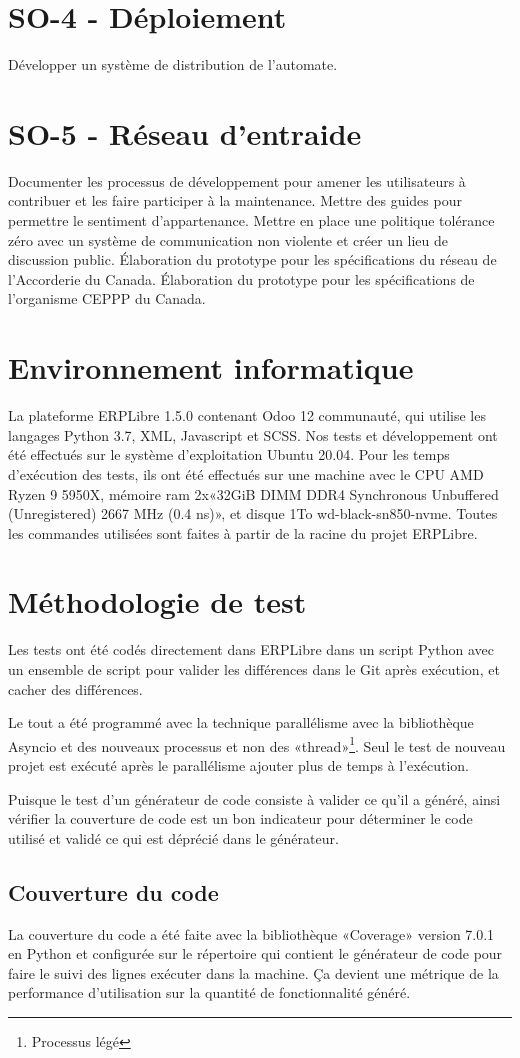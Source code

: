 \section{SO-4 - Déploiement}
Développer un système de distribution de l’automate.

\section{SO-5 - Réseau d’entraide}
Documenter les processus de développement pour amener les utilisateurs à contribuer et les faire participer à la maintenance. Mettre des guides pour permettre le sentiment d'appartenance. Mettre en place une politique tolérance zéro avec un système de communication non violente et créer un lieu de discussion public. Élaboration du prototype pour les spécifications du réseau de l’Accorderie du Canada. Élaboration du prototype pour les spécifications de l’organisme CEPPP du Canada.

\section{Environnement informatique}
La plateforme ERPLibre 1.5.0 contenant Odoo 12 communauté, qui utilise les langages Python 3.7, XML, Javascript et SCSS. Nos tests et développement ont été effectués sur le système d’exploitation Ubuntu 20.04.
Pour les temps d’exécution des tests, ils ont été effectués sur une machine avec le CPU AMD Ryzen 9 5950X, mémoire ram 2x«32GiB DIMM DDR4 Synchronous Unbuffered (Unregistered) 2667 MHz (0.4 ns)», et disque 1To wd-black-sn850-nvme.
Toutes les commandes utilisées sont faites à partir de la racine du projet ERPLibre.

\section{Méthodologie de test}
Les tests ont été codés directement dans ERPLibre dans un script Python avec un ensemble de script pour valider les différences dans le Git après exécution, et cacher des différences.

Le tout a été programmé avec la technique parallélisme avec la bibliothèque Asyncio et des nouveaux processus et non des «thread»\footnote{Processus légé}. Seul le test de nouveau projet est exécuté après le parallélisme ajouter plus de temps à l’exécution.

Puisque le test d’un générateur de code consiste à valider ce qu’il a généré, ainsi vérifier la couverture de code est un bon indicateur pour déterminer le code utilisé et validé ce qui est déprécié dans le générateur.

\subsection{Couverture du code}
La couverture du code a été faite avec la bibliothèque «Coverage» version 7.0.1 en Python et configurée sur le répertoire qui contient le générateur de code pour faire le suivi des lignes exécuter dans la machine. Ça devient une métrique de la performance d’utilisation sur la quantité de fonctionnalité généré.
